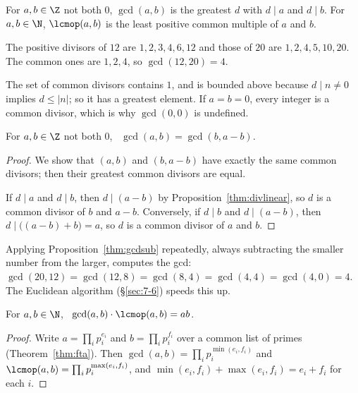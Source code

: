 \begin{definition}
For $a,b\in\Z$ not both $0$, $\gcd(a,b)$ is the greatest $d$ with $d\mid a$ and $d\mid b$. For $a,b\in\N$, $\lcmop(a,b)$ is the least positive common multiple of $a$ and $b$.
\end{definition}

\begin{example}
The positive divisors of $12$ are $1,2,3,4,6,12$ and those of $20$ are $1,2,4,5,10,20$. The common ones are $1,2,4$, so $\gcd(12,20)=4$.
\end{example}

\begin{note}
The set of common divisors contains $1$, and is bounded above because $d\mid n\ne0$ implies $d\le|n|$; so it has a greatest element. If $a=b=0$, every integer is a common divisor, which is why $\gcd(0,0)$ is undefined.
\end{note}

\begin{proposition}
\label{thm:gcdsub}
For $a,b\in\Z$ not both $0$, \ $\gcd(a,b)=\gcd(b,a-b)$.
\end{proposition}
\begin{proof}
We show that $(a,b)$ and $(b,a-b)$ have exactly the same common divisors; then their greatest common divisors are equal.

If $d\mid a$ and $d\mid b$, then $d\mid(a-b)$ by Proposition~\ref{thm:divlinear}, so $d$ is a common divisor of $b$ and $a-b$. Conversely, if $d\mid b$ and $d\mid(a-b)$, then $d\mid\bigl((a-b)+b\bigr)=a$, so $d$ is a common divisor of $a$ and $b$.
\end{proof}

\begin{note}
Applying Proposition~\ref{thm:gcdsub} repeatedly, always subtracting the smaller number from the larger, computes the gcd: $\gcd(20,12)=\gcd(12,8)=\gcd(8,4)=\gcd(4,4)=\gcd(4,0)=4$. The Euclidean algorithm (\S\ref{sec:7-6}) speeds this up.
\end{note}

\begin{proposition}
\label{thm:gcdlcm}
For $a,b\in\N$, \ $\gcd(a,b)\cdot\lcmop(a,b)=ab$.
\end{proposition}
\begin{proof}
Write $a=\prod_i p_i^{e_i}$ and $b=\prod_i p_i^{f_i}$ over a common list of primes (Theorem~\ref{thm:fta}). Then $\gcd(a,b)=\prod_i p_i^{\min(e_i,f_i)}$ and $\lcmop(a,b)=\prod_i p_i^{\max(e_i,f_i)}$, and $\min(e_i,f_i)+\max(e_i,f_i)=e_i+f_i$ for each $i$.
\end{proof}

